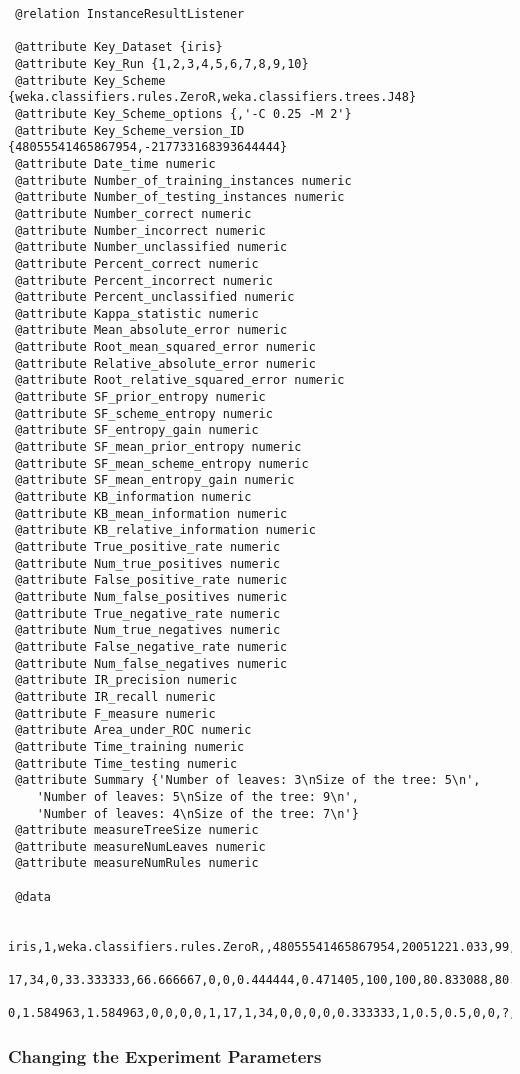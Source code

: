 \begin{verbatim}
 @relation InstanceResultListener
 
 @attribute Key_Dataset {iris}
 @attribute Key_Run {1,2,3,4,5,6,7,8,9,10}
 @attribute Key_Scheme {weka.classifiers.rules.ZeroR,weka.classifiers.trees.J48}
 @attribute Key_Scheme_options {,'-C 0.25 -M 2'}
 @attribute Key_Scheme_version_ID {48055541465867954,-217733168393644444}
 @attribute Date_time numeric
 @attribute Number_of_training_instances numeric
 @attribute Number_of_testing_instances numeric
 @attribute Number_correct numeric
 @attribute Number_incorrect numeric
 @attribute Number_unclassified numeric
 @attribute Percent_correct numeric
 @attribute Percent_incorrect numeric
 @attribute Percent_unclassified numeric
 @attribute Kappa_statistic numeric
 @attribute Mean_absolute_error numeric
 @attribute Root_mean_squared_error numeric
 @attribute Relative_absolute_error numeric
 @attribute Root_relative_squared_error numeric
 @attribute SF_prior_entropy numeric
 @attribute SF_scheme_entropy numeric
 @attribute SF_entropy_gain numeric
 @attribute SF_mean_prior_entropy numeric
 @attribute SF_mean_scheme_entropy numeric
 @attribute SF_mean_entropy_gain numeric
 @attribute KB_information numeric
 @attribute KB_mean_information numeric
 @attribute KB_relative_information numeric
 @attribute True_positive_rate numeric
 @attribute Num_true_positives numeric
 @attribute False_positive_rate numeric
 @attribute Num_false_positives numeric
 @attribute True_negative_rate numeric
 @attribute Num_true_negatives numeric
 @attribute False_negative_rate numeric
 @attribute Num_false_negatives numeric
 @attribute IR_precision numeric
 @attribute IR_recall numeric
 @attribute F_measure numeric
 @attribute Area_under_ROC numeric
 @attribute Time_training numeric
 @attribute Time_testing numeric
 @attribute Summary {'Number of leaves: 3\nSize of the tree: 5\n',
    'Number of leaves: 5\nSize of the tree: 9\n',
    'Number of leaves: 4\nSize of the tree: 7\n'}
 @attribute measureTreeSize numeric
 @attribute measureNumLeaves numeric
 @attribute measureNumRules numeric

 @data
 
 iris,1,weka.classifiers.rules.ZeroR,,48055541465867954,20051221.033,99,51,
 17,34,0,33.333333,66.666667,0,0,0.444444,0.471405,100,100,80.833088,80.833088,
 0,1.584963,1.584963,0,0,0,0,1,17,1,34,0,0,0,0,0.333333,1,0.5,0.5,0,0,?,?,?,?
\end{verbatim}




\subsubsection{Changing the Experiment Parameters}

